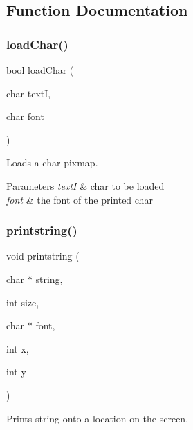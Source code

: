 \subsection{Function Documentation}
\mbox{\label{group__font_ga924391150c43d65d2a69422b57f0e9ca}} 
\subsubsection{\texorpdfstring{loadChar()}{loadChar()}}
{\footnotesize\ttfamily bool load\+Char (\begin{DoxyParamCaption}\item[{char}]{textI,  }\item[{char}]{font }\end{DoxyParamCaption})}



Loads a char pixmap. 


\begin{DoxyParams}{Parameters}
{\em textI} & char to be loaded \\
\hline
{\em font} & the font of the printed char \\
\hline
\end{DoxyParams}
\mbox{\label{group__font_ga673023bd0075969c22f8aa5761f59908}} 
\subsubsection{\texorpdfstring{printstring()}{printstring()}}
{\footnotesize\ttfamily void printstring (\begin{DoxyParamCaption}\item[{char $\ast$}]{string,  }\item[{int}]{size,  }\item[{char $\ast$}]{font,  }\item[{int}]{x,  }\item[{int}]{y }\end{DoxyParamCaption})}



Prints string onto a location on the screen. 


